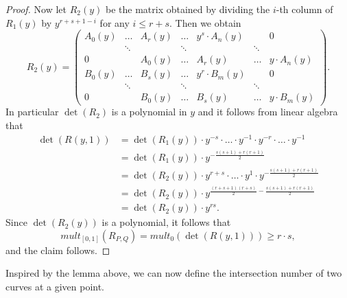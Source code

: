 \documentclass{article}
\newcommand{\rb}[1]{\left( #1 \right)}
\renewcommand{\sb}[1]{\left[ #1 \right]}
\theoremstyle{definition}\newtheorem{definition}{Definition}[section]
\theoremstyle{definition}\newtheorem{notation}[definition]{Notation}
\theoremstyle{definition}\newtheorem{remark}[definition]{Remark}
\theoremstyle{definition}\newtheorem{example}[definition]{Example}
\theoremstyle{definition}\newtheorem{fact}{Fact}
\theoremstyle{definition}\newtheorem{exercise}{Exercise}
\begin{document}
\begin{proof}
Now let $ R_2\rb{y} $ be the matrix obtained by dividing the $ i $-th column of $ R_1\rb{y} $ by $ y^{r + s + 1 - i} $ for any $ i \le r + s $. Then we obtain
$$ R_2\rb{y} = \begin{pmatrix} A_0\rb{y} & \dots & A_r\rb{y} & \dots & y^s \cdot A_n\rb{y} & & 0 \\ & \ddots & & \ddots & & \ddots & \\ 0 & & A_0\rb{y} & \dots & A_r\rb{y} & \dots & y \cdot A_n\rb{y} \\ B_0\rb{y} & \dots & B_s\rb{y} & \dots & y^r \cdot B_m\rb{y} & & 0 \\ & \ddots & & \ddots & & \ddots & \\ 0 & & B_0\rb{y} & \dots & B_s\rb{y} & \dots & y \cdot B_m\rb{y} \end{pmatrix}. $$
In particular $ \det\rb{R_2} $ is a polynomial in $ y $ and it follows from linear algebra that
\begin{align*}
\det\rb{R\rb{y, 1}}
& = \det\rb{R_1\rb{y}} \cdot y^{-s} \cdot \dots \cdot y^{-1} \cdot y^{-r} \cdot \dots \cdot y^{-1} \\
& = \det\rb{R_1\rb{y}} \cdot y^{-\tfrac{s\rb{s + 1}+r\rb{r + 1}}{2}} \\
& = \det\rb{R_2\rb{y}} \cdot y^{r + s} \cdot \dots \cdot y^1 \cdot y^{-\tfrac{s\rb{s + 1} + r\rb{r + 1}}{2}} \\
& = \det\rb{R_2\rb{y}} \cdot y^{\tfrac{\rb{r + s + 1}\rb{r + s}}{2} - \tfrac{s\rb{s + 1}+r\rb{r + 1}}{2}} \\
& = \det\rb{R_2\rb{y}} \cdot y^{rs}.
\end{align*}
Since $ \det\rb{R_2\rb{y}} $ is a polynomial, it follows that
$$ mult_{\sb{0, 1}}\rb{R_{P, Q}} = mult_0\rb{\det\rb{R\rb{y, 1}}} \ge r \cdot s, $$
and the claim follows.
\end{proof}

Inspired by the lemma above, we can now define the intersection number of two curves at a given point.
\end{document}

